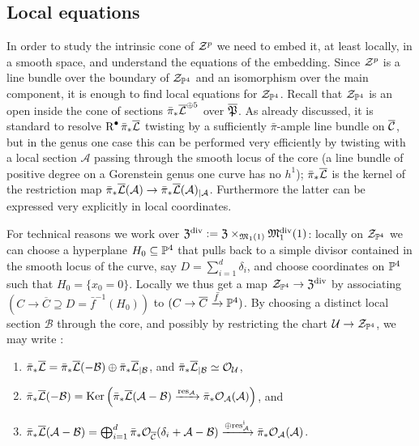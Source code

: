 \subsection{Local equations} In order to study the intrinsic cone of $\mathcal Z^p$ we need to embed it, at least locally, in a smooth space, and understand the equations of the embedding. Since $\mathcal Z^p$ is a line bundle over the boundary of $\mathcal Z_{\mathbb P^4}$ and an isomorphism over the main component, it is enough to find local equations for $\mathcal Z_{\mathbb P^4}$. Recall that $\mathcal Z_{\mathbb P^4}$ is an open inside the cone of sections $\bar{\pi}_*\overline{\mathcal{L}}^{\oplus 5}$ over $\overline{\mathfrak{P}}$. As already discussed, it is standard to resolve $\operatorname{R}^{\bullet}\bar{\pi}_*\overline{\mathcal{L}}$ twisting by a sufficiently $\bar{\pi}$-ample line bundle on $\overline{\mathcal{C}}$, but in the genus one case this can be performed very efficiently by twisting with a local section $\mathcal A$ passing through the smooth locus of the core (a line bundle of positive degree on a Gorenstein genus one curve has no $h^1$); $\bar{\pi}_*\overline{\mathcal{L}}$ is the kernel of the restriction map $\bar{\pi}_*\overline{\mathcal{L}}(\mathcal A)\rightarrow \bar{\pi}_*\overline{\mathcal{L}}(\mathcal A)_{|\mathcal A}$. Furthermore the latter can be expressed very explicitly in local coordinates.

For technical reasons we work over $\mathfrak Z^{\rm{div}}:=\mathfrak Z\times_{\mathfrak M_1(1)}\mathfrak M_1^{\textrm{div}}(1)$: locally on $\mathcal Z_{\mathbb P^4}$ we can choose a hyperplane $H_0\subseteq\mathbb P^4$ that pulls back to a simple divisor contained in the smooth locus of the curve, say $D=\sum_{i=1}^d \delta_i$, and choose coordinates on $\mathbb P^4$ such that $H_0=\{x_0=0\}$. Locally we thus get a map $\mathcal Z_{\mathbb P^4}\rightarrow \mathfrak Z^{\rm{div}}$ by associating $(C\to\overline{C}\supseteq D=\bar{f}^{-1}(H_0))$ to $(C\rightarrow \overline{C}\xrightarrow{\bar{f}}\mathbb P^4)$. By choosing a distinct local section $\mathcal B$ through the core, and possibly by restricting the chart $\mathcal U\rightarrow\mathcal Z_{\mathbb P^4}$, we may write \cite[Lemma 4.10]{HL}:
\begin{enumerate}
 \item $\bar{\pi}_*\overline{\mathcal{L}}=\bar{\pi}_*\overline{\mathcal{L}}(-\mathcal B)\oplus \bar{\pi}_*\overline{\mathcal{L}}_{|\mathcal B}$, and $\bar{\pi}_*\overline{\mathcal{L}}_{|\mathcal B}\simeq \mathcal{O}_{\mathcal U}$,
 \item $\bar{\pi}_*\overline{\mathcal{L}}(-\mathcal B)=\operatorname{Ker}\left(\bar{\pi}_*\overline{\mathcal{L}}(\mathcal A-\mathcal B)\xrightarrow{\rm{res}_{\mathcal A}}\bar{\pi}_*\mathcal{O}_{\mathcal A}(\mathcal A)\right)$, and
 \item $\bar{\pi}_*\overline{\mathcal{L}}(\mathcal A-\mathcal B)=\bigoplus_{i=1}^d \bar{\pi}_*\mathcal{O}_{\overline{\mathcal C}}(\delta_i+\mathcal A-\mathcal B)\xrightarrow{\oplus \rm{res}^i_{\mathcal A}}\bar{\pi}_*\mathcal{O}_{\mathcal A}(\mathcal A)$.
\end{enumerate}

